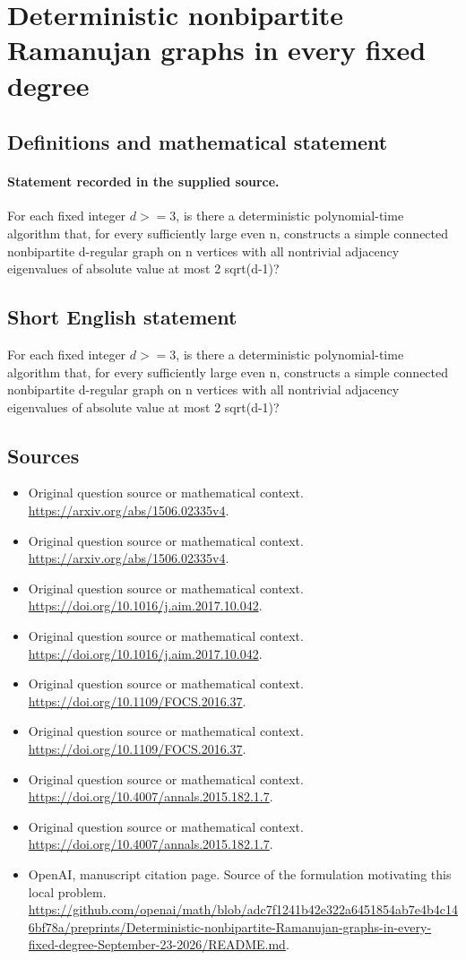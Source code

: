 \documentclass[11pt]{article}
\begin{document}
\section*{Deterministic nonbipartite Ramanujan graphs in every fixed degree}\label{30007085}
\subsection{Definitions and mathematical statement}
\paragraph{Statement recorded in the supplied source.}
For each fixed integer $d>=3$, is there a deterministic polynomial-time algorithm that, for every sufficiently large even n, constructs a simple connected nonbipartite d-regular graph on n vertices with all nontrivial adjacency eigenvalues of absolute value at most 2 sqrt(d-1)?
\subsection{Short English statement}
For each fixed integer $d>=3$, is there a deterministic polynomial-time algorithm that, for every sufficiently large even n, constructs a simple connected nonbipartite d-regular graph on n vertices with all nontrivial adjacency eigenvalues of absolute value at most 2 sqrt(d-1)?
\subsection{Sources}
\begin{itemize}
\item[S1] Original question source or mathematical context.
\url{https://arxiv.org/abs/1506.02335v4}.
\item[S2] Original question source or mathematical context.
\url{https://arxiv.org/abs/1506.02335v4}.
\item[S3] Original question source or mathematical context.
\url{https://doi.org/10.1016/j.aim.2017.10.042}.
\item[S4] Original question source or mathematical context.
\url{https://doi.org/10.1016/j.aim.2017.10.042}.
\item[S5] Original question source or mathematical context.
\url{https://doi.org/10.1109/FOCS.2016.37}.
\item[S6] Original question source or mathematical context.
\url{https://doi.org/10.1109/FOCS.2016.37}.
\item[S7] Original question source or mathematical context.
\url{https://doi.org/10.4007/annals.2015.182.1.7}.
\item[S8] Original question source or mathematical context.
\url{https://doi.org/10.4007/annals.2015.182.1.7}.
\item[S9] OpenAI, manuscript citation page. Source of the formulation motivating this local problem.
\url{https://github.com/openai/math/blob/adc7f1241b42e322a6451854ab7e4b4c146bf78a/preprints/Deterministic-nonbipartite-Ramanujan-graphs-in-every-fixed-degree-September-23-2026/README.md}.
\end{itemize}
\end{document}
